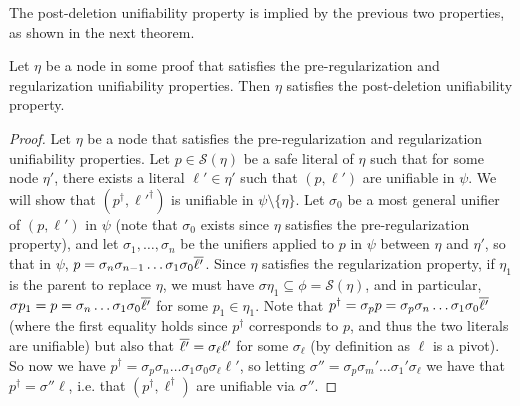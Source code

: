 The post-deletion unifiability property is implied by the previous two properties, as shown in the next theorem.

\begin{thm}
Let $\eta$ be a node in some proof that satisfies the pre-regularization and regularization unifiability properties. Then $\eta$ satisfies the post-deletion unifiability property.
\end{thm}

\begin{proof}
Let $\eta$ be a node that satisfies the pre-regularization and regularization unifiability properties.
Let $p\in \mathcal{S}(\eta)$ be a safe literal of $\eta$ such that for some node $\eta'$, there exists a literal $\ell' \in \eta'$ such that $(p,\ell')$ are unifiable in $\psi$. We will show that $(p^\dagger,\ell'^\dagger)$ is unifiable in $\psi\setminus\{\eta\}$. 
Let $\sigma_0$ be a most general unifier of $(p,\ell')$ in $\psi$ (note that $\sigma_0$ exists since $\eta$ satisfies the pre-regularization property), and let $\sigma_1,\ldots,\sigma_n$ be the unifiers applied to $p$ in $\psi$ between $\eta$ and $\eta'$, so that in $\psi$, $p=\sigma_n\sigma_{n-1}\ldots\sigma_1\sigma_0\overline{\ell'}$. Since $\eta$ satisfies the regularization property, if $\eta_1$ is the parent to replace $\eta$, we must have $\sigma\eta_1\subseteq \phi = \mathcal{S}(\eta)$, and in particular, $\sigma p_1 = p = \sigma_n\ldots\sigma_1\sigma_0\overline{\ell'}$ for some $p_1\in \eta_1$. 
Note that $p^\dagger = \sigma_p p = \sigma_p\sigma_n\ldots\sigma_1\sigma_0\overline{\ell'}$ (where the first equality holds since $p^\dagger$ corresponds to $p$, and thus the two literals are unifiable) but also that $\overline{\ell'} = \sigma_\ell\ell'$ for some $\sigma_\ell$ (by definition as $\ell$ is a pivot). So now we have $p^\dagger =  \sigma_p\sigma_n\ldots\sigma_1\sigma_0\sigma_\ell\ell'$, so letting $\sigma''=\sigma_p\sigma_m'\ldots\sigma_1'\sigma_\ell$ we have that $p^\dagger = \sigma'' \ell$, i.e. that $(p^\dagger,\ell^\dagger)$ are unifiable via $\sigma''$.

\end{proof}


